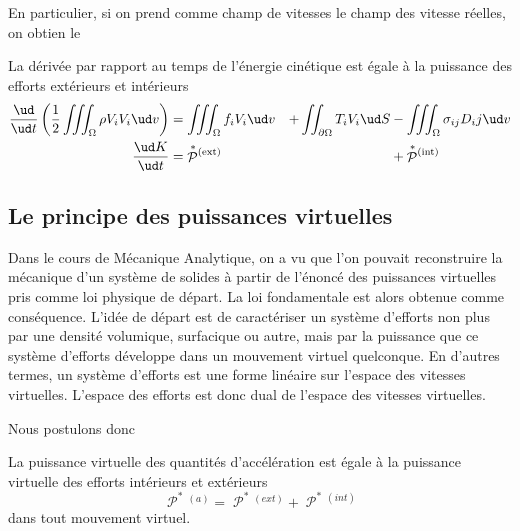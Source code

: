 En particulier, si on prend comme champ de vitesses le champ des vitesse réelles, on obtien le
\begin{thmn}
    La dérivée par rapport au temps de l'énergie cinétique est égale à la puissance des efforts extérieurs et intérieurs
    \begin{align}
        \frac{\ud}{\ud t}\left( \frac{1}{2}\iiint_{\Omega} \rho V_iV_i \ud v\right) &= \iiint_{\Omega} f_i V_i \ud v &+ \iint_{\partial\Omega} T_i V_i \ud S &- \iiint_{\Omega} \sigma_{ij} D_ij \ud v \nonumber\\
        \frac{\ud K}{\ud t} &= \mathop{\mathcal{P}}^{\ast}{\!}^{(\text{ext})} &&+ \mathop{\mathcal{P}}^{\ast}{\!}^{(\text{int})}
        \label{eq:Ch01-029}
    \end{align}
\end{thmn}
\subsection{Le principe des puissances virtuelles} \label{ssec:Ch01-2.2}
Dans le cours de Mécanique Analytique, on a vu que l'on pouvait reconstruire la mécanique d'un système de solides à partir de l'énoncé des puissances virtuelles pris comme loi physique de départ.
La loi fondamentale est alors obtenue comme conséquence.
L'idée de départ est de caractériser un système d'efforts non plus par une densité volumique, surfacique ou autre, mais par la puissance que ce système d'efforts développe dans un mouvement virtuel quelconque.
En d'autres termes, un système d'efforts est une forme linéaire sur l'espace des vitesses virtuelles.
L'espace des efforts est donc dual de l'espace des vitesses virtuelles.

Nous postulons donc
\begin{Principe}
    La puissance virtuelle des quantités d'accélération est égale à la puissance virtuelle des efforts intérieurs et extérieurs
    \begin{equation}
        \mathop{\mathcal{P}}^{\ast}{\!}^{(a)} = \mathop{\mathcal{P}}^{\ast}{\!}^{(ext)} + \mathop{\mathcal{P}}^{\ast}{\!}^{(int)}
        \label{eq:Ch01-030}
    \end{equation}
    dans tout mouvement virtuel.
\end{Principe}


